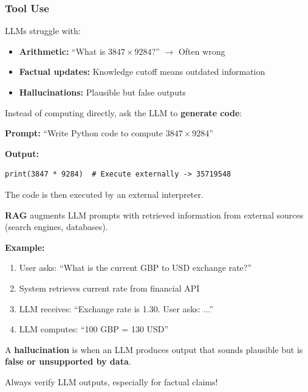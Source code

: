 \bigseparator

\subsubsection{Tool Use}

\begin{tipbox}
LLMs struggle with:
\begin{itemize}
  \item \textbf{Arithmetic:} ``What is $3847 \times 9284$?'' $\to$ Often wrong
  \item \textbf{Factual updates:} Knowledge cutoff means outdated information
  \item \textbf{Hallucinations:} Plausible but false outputs
\end{itemize}
\end{tipbox}

\begin{defbox}
Instead of computing directly, ask the LLM to \textbf{generate code}:

\textbf{Prompt:} ``Write Python code to compute $3847 \times 9284$''

\textbf{Output:}
\begin{verbatim}
print(3847 * 9284)  # Execute externally -> 35719548
\end{verbatim}

The code is then executed by an external interpreter.
\end{defbox}

\begin{defbox}
\textbf{RAG} augments LLM prompts with retrieved information from external sources (search engines, databases).

\textbf{Example:}
\begin{enumerate}
  \item User asks: ``What is the current GBP to USD exchange rate?''
  \item System retrieves current rate from financial API
  \item LLM receives: ``Exchange rate is 1.30. User asks: ...''
  \item LLM computes: ``100 GBP = 130 USD''
\end{enumerate}
\end{defbox}

\begin{tipbox}
A \textbf{hallucination} is when an LLM produces output that sounds plausible but is \textbf{false or unsupported by data}.

Always verify LLM outputs, especially for factual claims!
\end{tipbox}

